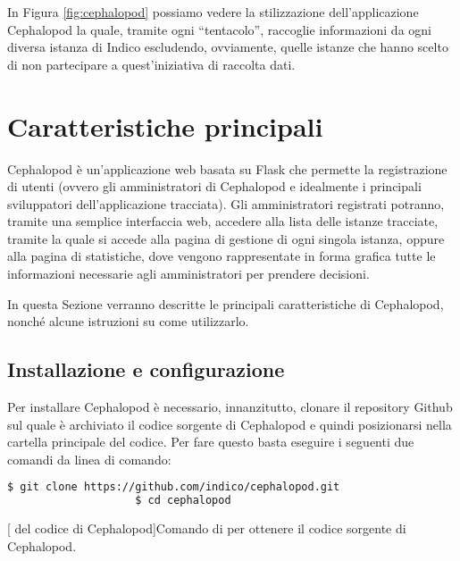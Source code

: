 	In Figura \ref{fig:cephalopod} possiamo vedere la stilizzazione dell'applicazione Cephalopod la quale, tramite ogni ``tentacolo'', raccoglie informazioni da ogni diversa istanza di Indico escludendo, ovviamente, quelle istanze che hanno scelto di non partecipare a quest'iniziativa di raccolta dati.
    
    \section{Caratteristiche principali} \label{sec:it;caratteristiche principali}
    
        Cephalopod è un'applicazione web basata su Flask che permette la registrazione di utenti (ovvero gli amministratori di Cephalopod e idealmente i principali sviluppatori dell'applicazione tracciata). Gli amministratori registrati potranno, tramite una semplice interfaccia web, accedere alla lista delle istanze tracciate, tramite la quale si accede alla pagina di gestione di ogni singola istanza, oppure alla pagina di statistiche, dove vengono rappresentate in forma grafica tutte le informazioni necessarie agli amministratori per prendere decisioni.
        
        In questa Sezione verranno descritte le principali caratteristiche di Cephalopod, nonché alcune istruzioni su come utilizzarlo.
        
        \subsection{Installazione e configurazione} \label{subsec:it;cp;installazione_configurazione}
        
            Per installare Cephalopod è necessario, innanzitutto, clonare il repository Github sul quale è archiviato il codice sorgente di Cephalopod e quindi posizionarsi nella cartella principale del codice. Per fare questo basta eseguire i seguenti due comandi da linea di comando:
            
            \begin{center}
                \begin{lstlisting}[language=bash, gobble=18]
                    $ git clone https://github.com/indico/cephalopod.git
                    $ cd cephalopod
                \end{lstlisting}
                \captionsetup{textformat=empty,labelformat=empty} \vspace{-2em}
                [ del codice di Cephalopod]{Comando di  per ottenere il codice sorgente di Cephalopod.}
            \end{center}
            
